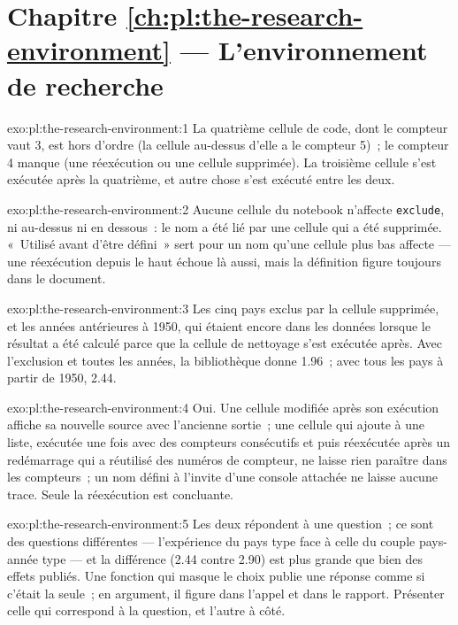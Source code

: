 \section*{Chapitre \ref{ch:pl:the-research-environment} --- L'environnement de recherche}

\begin{solution}{exo:pl:the-research-environment:1}
La quatrième cellule de code, dont le compteur vaut 3, est hors d'ordre (la cellule au-dessus d'elle a le compteur 5)~; le compteur 4 manque (une réexécution ou une cellule supprimée). La
troisième cellule s'est exécutée après la quatrième, et autre chose s'est exécuté entre les deux.
\end{solution}

\begin{solution}{exo:pl:the-research-environment:2}
Aucune cellule du notebook n'affecte \texttt{exclude}, ni au-dessus ni en dessous~: le nom a été lié par une cellule qui a été supprimée. «~Utilisé avant d'être défini~» sert pour un
nom qu'une cellule plus bas affecte --- une réexécution depuis le haut échoue là aussi, mais la définition figure toujours dans le document.
\end{solution}

\begin{solution}{exo:pl:the-research-environment:3}
Les cinq pays exclus par la cellule supprimée, et les années antérieures à 1950, qui étaient encore dans les données lorsque le résultat a été calculé parce que la
cellule de nettoyage s'est exécutée après. Avec l'exclusion et toutes les années, la bibliothèque donne 1.96~; avec tous les pays à partir de 1950, 2.44.
\end{solution}

\begin{solution}{exo:pl:the-research-environment:4}
Oui. Une cellule modifiée après son exécution affiche sa nouvelle source avec l'ancienne sortie~; une cellule qui ajoute à une liste, exécutée une fois avec des compteurs consécutifs et
puis réexécutée après un redémarrage qui a réutilisé des numéros de compteur, ne laisse rien paraître dans les compteurs~; un nom défini à l'invite d'une console attachée
ne laisse aucune trace. Seule la réexécution est concluante.
\end{solution}

\begin{solution}{exo:pl:the-research-environment:5}
Les deux répondent à une question~; ce sont des questions différentes --- l'expérience du pays type face à celle du couple pays-année type --- et la
différence (2.44 contre 2.90) est plus grande que bien des effets publiés. Une fonction qui masque le choix publie une réponse comme si c'était la
seule~; en argument, il figure dans l'appel et dans le rapport. Présenter celle qui correspond à la question, et l'autre à côté.
\end{solution}

